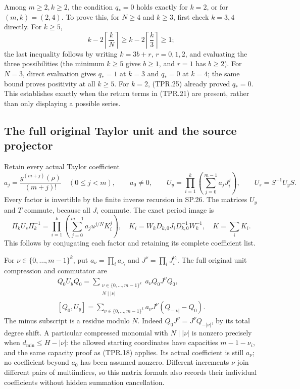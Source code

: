 Among \(m\geq2,k\geq2\), the condition \(q_*=0\) holds
exactly for \(k=2\), or for \((m,k)=(2,4)\).
To prove this, for \(N\geq4\) and \(k\geq3\), first
check \(k=3,4\) directly. For \(k\geq5\),
\[
 k-2\left\lceil\frac{k}N\right\rceil
 \geq k-2\left\lceil\frac{k}{3}\right\rceil\geq1;
 \tag{TPR.27}
\]
the last inequality follows by writing \(k=3b+r\),
\(r=0,1,2\), and evaluating the three possibilities
(the minimum \(k\geq5\) gives \(b\geq1\), and \(r=1\)
has \(b\geq2\)). For \(N=3\), direct evaluation gives
\(q_*=1\) at \(k=3\) and \(q_*=0\) at \(k=4\);
the same bound proves positivity at all \(k\geq5\).
For \(k=2\), (TPR.25) already proved \(q_*=0\).
This establishes exactly when the return terms in (TPR.21)
are present, rather than only displaying a possible series.

\subsection*{The full original Taylor unit and the source projector}

Retain every actual Taylor coefficient
\[
 a_j=\frac{g^{(m+j)}(\rho)}{(m+j)!}\quad(0\leq j<m),
       \qquad a_0\ne0,\qquad
 U_y=\prod_{i=1}^k\left(\sum_{j=0}^{m-1}a_jJ_i^j\right),
       \qquad U_s=S^{-1}U_yS .
 \tag{TPR.28}
\]
Every factor is invertible by the finite inverse recursion in
SP.26. The matrices \(U_y\) and \(T\) commute, because all
\(J_i\) commute. The exact period image is
\[
 \Pi_kU_s\Pi_k^{-1}
  =\prod_{i=1}^k
       \left(\sum_{j=0}^{m-1}a_j u^{j/N}K_i^j\right),
 \quad
 K_i=W_kD_{k,0}J_iD_{k,0}^{-1}W_k^{-1},\quad K=\sum_iK_i .
 \tag{TPR.29}
\]
This follows by conjugating each factor and retaining its
complete coefficient list.

For \(\nu\in\{0,\ldots,m-1\}^k\), put
\(a_\nu=\prod_i a_{\nu_i}\) and \(J^\nu=\prod_iJ_i^{\nu_i}\).
The full original unit compression and commutator are
\[
 \begin{gathered}
 Q_0U_yQ_0
   =\sum_{\substack{\nu\in\{0,\ldots,m-1\}^k\\N\mid|\nu|}}
           a_\nu Q_0J^\nu Q_0,\\
 [Q_0,U_y]
    =\sum_{\nu\in\{0,\ldots,m-1\}^k}
           a_\nu J^\nu(Q_{-|\nu|}-Q_0).
 \end{gathered}
 \tag{TPR.30}
\]
The minus subscript is a residue modulo \(N\).
Indeed \(Q_0J^\nu=J^\nu Q_{-|\nu|}\), by its total degree
shift. A particular compressed monomial with \(N\mid|\nu|\)
is nonzero precisely when \(d_{\min}\leq H-|\nu|\):
the allowed starting coordinates have capacities
\(m-1-\nu_i\), and the same capacity proof as (TPR.18)
applies. Its actual coefficient is still \(a_\nu\);
no coefficient beyond \(a_0\) has been assumed nonzero.
Different increments \(\nu\) join different pairs of
multiindices, so this matrix formula also records their
individual coefficients without hidden summation cancellation.

